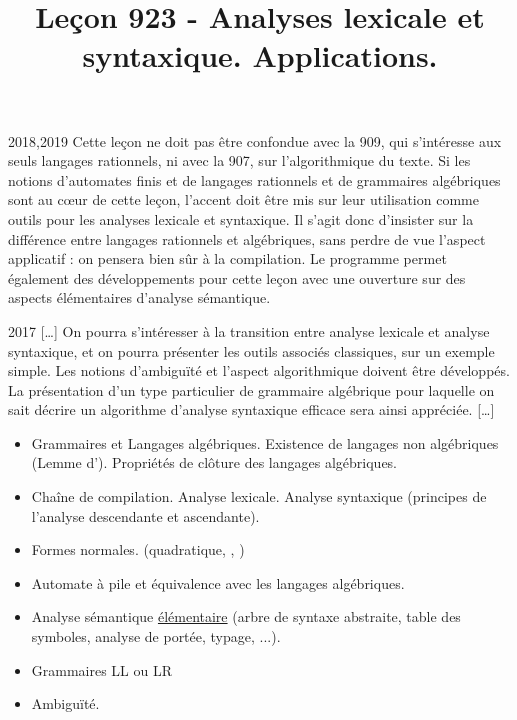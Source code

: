 \documentclass{agregfiche}
\title{Leçon 923 - Analyses lexicale et syntaxique. Applications.}
\begin{document}
\maketitle

\secrapports
\begin{rapport}{2018,2019}
    Cette leçon ne doit pas être confondue avec la 909, qui s’intéresse aux seuls langages rationnels, ni avec
    la 907, sur l’algorithmique du texte.
    Si les notions d’automates finis et de langages rationnels et de grammaires algébriques sont au cœur
    de cette leçon, l’accent doit être mis sur leur utilisation comme outils pour les analyses lexicale et
    syntaxique. Il s’agit donc d’insister sur la différence entre langages rationnels et algébriques, sans perdre
    de vue l’aspect applicatif : on pensera bien sûr à la compilation. Le programme permet également des
    développements pour cette leçon avec une ouverture sur des aspects élémentaires d’analyse sémantique.
\end{rapport}

\begin{rapport}{2017}
[\dots]    On pourra s’intéresser à la transition entre analyse lexicale et analyse syntaxique, et on pourra présenter les outils associés classiques, sur un exemple
    simple. Les notions d’ambiguïté et l’aspect algorithmique doivent être développés. La présentation
    d’un type particulier de grammaire algébrique pour laquelle on sait décrire un algorithme d’analyse
    syntaxique efficace sera ainsi appréciée. [\dots]
    \end{rapport}

\secindispensables

\begin{itemize}
	\item Grammaires et Langages algébriques. Existence de langages non algébriques (Lemme d'). Propriétés de clôture
    des langages algébriques.
    \item Chaîne de compilation. Analyse lexicale. Analyse syntaxique (principes de l’analyse descendante
    et ascendante).
\end{itemize}

\secasavoir

\begin{itemize}
    \item Formes normales. (quadratique, , )
    \item Automate à pile et équivalence avec les langages algébriques.
    \item Analyse sémantique \underline{élémentaire} (arbre de syntaxe abstraite, table des symboles,
    analyse de portée, typage, ...).
    \item Grammaires LL ou LR
    \item Ambiguïté.
\end{itemize}
\end{document}
